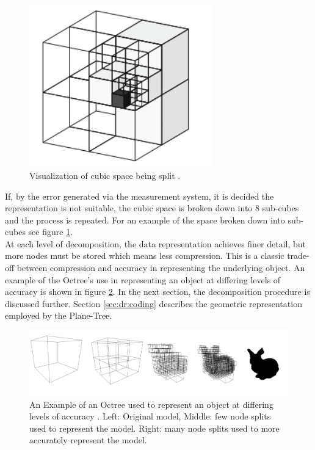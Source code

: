 \begin{figure}[!htb]
\centering
\includegraphics[width=8cm]{images/methodology/pt/octreeVis}
\caption{Visualization of cubic space being split \cite{Hornung13Octomap}.}
\label{fig:SpaceVis}
\end{figure}

If, by the error generated via the measurement system, it is decided the representation is not suitable, the cubic space is broken down into 8 sub-cubes and the process is repeated. For an example of the space broken down into sub-cubes see figure \ref{fig:SpaceVis}. \\

At each level of decomposition, the data representation achieves finer detail, but more nodes must be stored which means less compression. This is a classic trade-off between compression and accuracy in representing the underlying object. An example of the Octree's use in representing an object at differing levels of accuracy is shown in figure \ref{fig:octreeaccuracy}. In the next section, the decomposition procedure is discussed further. Section \ref{sec:dr:coding} describes the geometric representation employed by the Plane-Tree.


\begin{figure}[!htb]
\centering
\includegraphics[width=14cm]{images/ch2/OctreeExample}
\caption{An Example of an Octree used to represent an object at differing levels of accuracy \cite{Hornung13Octomap}. Left: Original model, Middle: few node splits used to represent the model. Right: many node splits used to more accurately represent the model.}
\label{fig:octreeaccuracy}
\end{figure}


